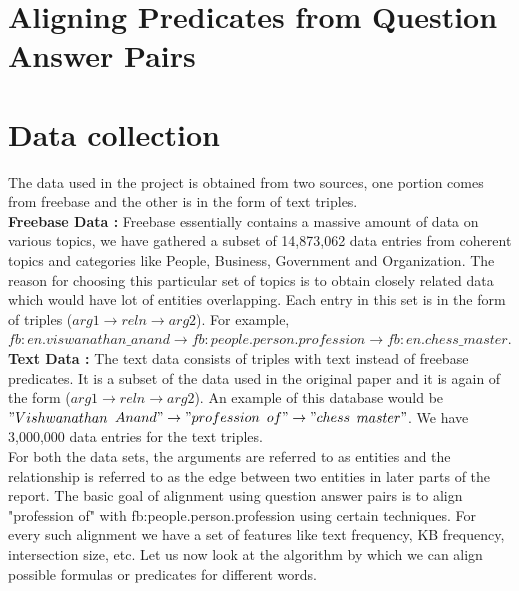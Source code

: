 \documentclass[12pt, a4paper]{article}
\begin{document}
\section{Aligning Predicates from Question Answer Pairs}



\section{Data collection}
The data used in the project is obtained from two sources, one portion comes from freebase and the other is in the form of text triples.\\

{\bf Freebase Data : }Freebase essentially contains a massive amount of data on various topics, we have gathered a subset of 14,873,062 data entries from coherent topics and categories like People, Business, Government and Organization. The reason for choosing this particular set of topics is to obtain closely related data which would have lot of entities overlapping. Each entry in this set is in the form of triples ($arg1\rightarrow reln \rightarrow arg2$). For example, $fb:en.viswanathan\_anand \rightarrow	fb:people.person.profession \rightarrow	fb:en.chess\_master$. \\

{\bf Text Data : }The text data consists of triples with text instead of freebase predicates. It is a subset of the data used in the original paper and it is again of the form ($arg1\rightarrow reln \rightarrow arg2$). An example of this database would be $"Vishwanathan$ $Anand" \rightarrow "profession$ $of" \rightarrow "chess$ $master"$. We have 3,000,000 data entries for the text triples.\\

For both the data sets, the arguments are referred to as entities and the relationship is referred to as the edge between two entities in later parts of the report. The basic goal of alignment using question answer pairs is to align "profession of" with fb:people.person.profession using certain techniques. For every such alignment we have a set of features like text frequency, KB frequency, intersection size, etc.
Let us now look at the algorithm by which we can align possible formulas or predicates for different words.
\end{document}
